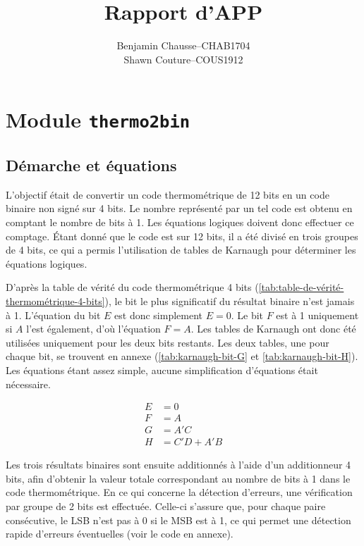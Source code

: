 \documentclass[a11paper]{article}
\title{Rapport d'APP}
\author{
  \addtolength{\tabcolsep}{-0.4em}
  \begin{tabular}{rcl} %
      Benjamin Chausse & -- & CHAB1704 \\
      Shawn Couture    & -- & COUS1912 \\
  \end{tabular}
}
\begin{document}
\maketitle
\newpage
\tableofcontents
\newpage

\section{Module \texttt{thermo2bin}}
\subsection{Démarche et équations}

L’objectif était de convertir un code thermométrique de 12 bits en un code
binaire non signé sur 4 bits. Le nombre représenté par un tel code est obtenu
en comptant le nombre de bits à 1. Les équations logiques doivent donc
effectuer ce comptage. Étant donné que le code est sur 12 bits, il a été
divisé en trois groupes de 4 bits, ce qui a permis l'utilisation de tables de
Karnaugh pour déterminer les équations logiques.

D'après la table de vérité du code thermométrique 4 bits
(\ref{tab:table-de-vérité-thermométrique-4-bits}), le bit le plus
significatif du résultat binaire n’est jamais à 1. L'équation du bit $E$ est
donc simplement $E = 0$. Le bit $F$ est à 1 uniquement si $A$ l’est
également, d’où l’équation $F = A$. Les tables de Karnaugh ont donc été
utilisées uniquement pour les deux bits restants. Les deux tables, une pour
chaque bit, se trouvent en annexe (\ref{tab:karnaugh-bit-G} et
\ref{tab:karnaugh-bit-H}). Les équations étant assez simple, aucune simplification d'équations était nécessaire.

\begin{align}
	E & = 0         \\
	F & = A         \\
	G & = A'C       \\
	H & = C'D + A'B
\end{align}

Les trois résultats binaires sont ensuite additionnés à l’aide d’un
additionneur 4 bits, afin d’obtenir la valeur totale correspondant au nombre
de bits à 1 dans le code thermométrique. En ce qui concerne la détection
d'erreurs, une vérification par groupe de 2 bits est effectuée. Celle-ci
s’assure que, pour chaque paire consécutive, le LSB n’est pas à 0 si le MSB
est à 1, ce qui permet une détection rapide d’erreurs éventuelles (voir le
code en annexe).
\end{document}

